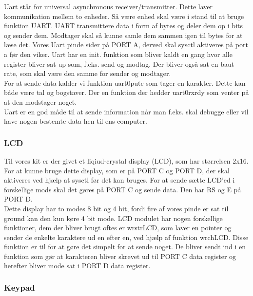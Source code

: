 Uart står for universal asynchronous receiver/transmitter. Dette laver kommunikation mellem to enheder. Så være enhed skal være i stand til at bruge funktion UART. UART transmittere data i form af bytes og deler dem op i bits og sender dem. Modtager skal så kunne samle dem sammen igen til bytes for at læse det.
Vores Uart pinde sider på PORT A, derved skal sysctl aktiveres på port a før den viker. Uart har en init. funktion som bliver kaldt en gang hvor alle register bliver sat up som, f.eks. send og modtag. Der bliver også sat en baut rate, som skal være den samme for sender og modtager.
\\
For at sende data kalder vi funktion uart0\textunderscore putc som tager en karakter. Dette kan både være tal og bogstaver. Der en funktion der hedder uart0\textunderscore rx\textunderscore rdy som venter på at den modstager noget.
\\
Uart er en god måde til at sende information når man f.eks. skal debugge eller vil have nogen bestemte data hen til ens computer.

\subsubsection{LCD}

Til vores kit er der givet et liqiud-crystal display (LCD), som har størrelsen 2x16. For at kunne bruge dette display, som er på PORT C og PORT D, der skal aktiveres ved hjælp at sysctl før det kan bruges. For at sende sætte LCD’ed i forskellige mods skal det gøres på PORT C og sende data. Den har RS og E på PORT D.
\\
Dette display har to modes 8 bit og 4 bit, fordi fire af vores pinde er sat til ground kan den kun køre 4 bit mode.
LCD modulet har nogen forskellige funktioner, dem der bliver brugt oftes er wr\textunderscore str\textunderscore LCD, som laver en pointer og sender de enkelte karaktere ud en efter en, ved hjælp af funktion wr\textunderscore ch\textunderscore LCD. Disse funktion er til for at gøre det simpelt for at sende noget. De bliver sendt ind i en funktion som gør at karakteren bliver skrevet ud til PORT C data register og herefter bliver mode sat i PORT D data register.

\subsubsection{Keypad}

